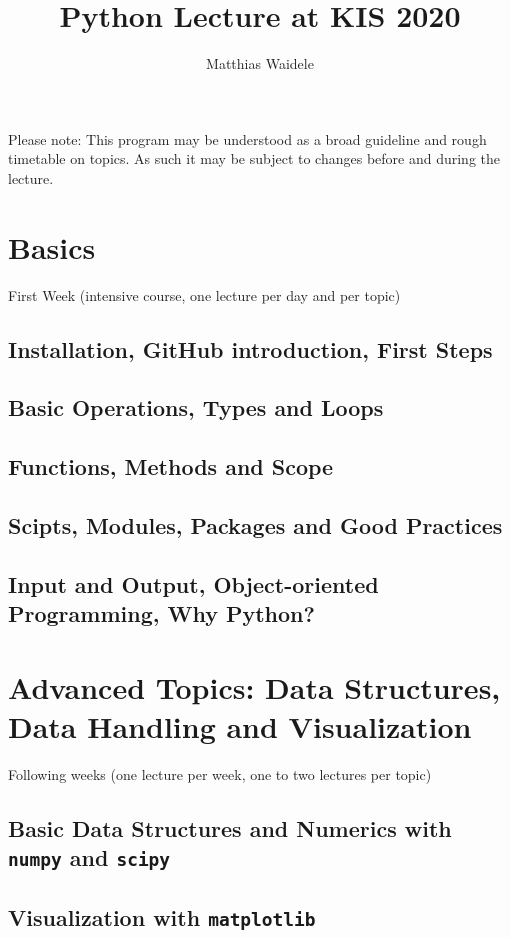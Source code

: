 \documentclass[10pt,a4paper]{article}
\begin{document}
	\title{Python Lecture at KIS 2020}
	\author{Matthias Waidele}
	\date{}
	
	\maketitle
	Please note: This program may be understood as a broad guideline and rough timetable on topics. As such it may be subject to changes before and during the lecture.
	
	\section{Basics}
	First Week (intensive course, one lecture per day and per topic)
	
		\subsection{Installation, GitHub introduction, First Steps}
		\subsection{Basic Operations, Types and Loops}
		\subsection{Functions, Methods and Scope}
		\subsection{Scipts, Modules, Packages and Good Practices}
		\subsection{Input and Output, Object-oriented Programming, Why Python?}
	
	\vspace{1cm}
	\section{Advanced Topics: Data Structures, Data Handling and Visualization}
	Following weeks (one lecture per week, one to two lectures per topic)
		
		\subsection{Basic Data Structures and Numerics with \texttt{numpy} and \texttt{scipy}}
		\subsection{Visualization with \texttt{matplotlib}}
\end{document}
